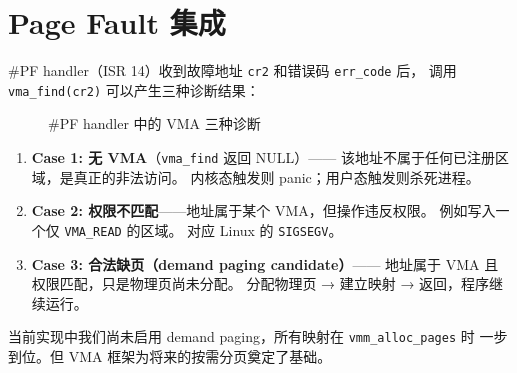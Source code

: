 \section{Page Fault 集成}
\label{sec:vma-pf}

\#PF handler（ISR 14）收到故障地址 \texttt{cr2} 和错误码 \texttt{err\_code} 后，
调用 \texttt{vma\_find(cr2)} 可以产生三种诊断结果：

\begin{figure}[H]
  \centering
  
  \caption{\#PF handler 中的 VMA 三种诊断}
  \label{fig:pf-vma-diag}
\end{figure}

\begin{enumerate}
  \item \textbf{Case 1: 无 VMA}（\texttt{vma\_find} 返回 NULL）——
        该地址不属于任何已注册区域，是真正的非法访问。
        内核态触发则 panic；用户态触发则杀死进程。

  \item \textbf{Case 2: 权限不匹配}——地址属于某个 VMA，但操作违反权限。
        例如写入一个仅 \texttt{VMA\_READ} 的区域。
        对应 Linux 的 \texttt{SIGSEGV}。

  \item \textbf{Case 3: 合法缺页（demand paging candidate）}——
        地址属于 VMA 且权限匹配，只是物理页尚未分配。
        分配物理页 → 建立映射 → 返回，程序继续运行。
\end{enumerate}

当前实现中我们尚未启用 demand paging，所有映射在 \texttt{vmm\_alloc\_pages} 时
一步到位。但 VMA 框架为将来的按需分页奠定了基础。


